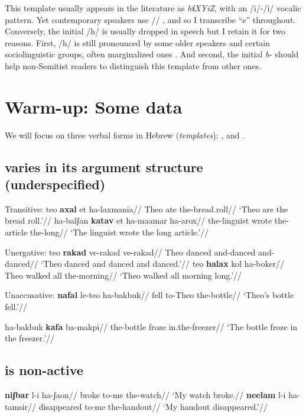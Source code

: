 This template usually appears in the literature as \emph{h\textbf{i}XYiZ}, with an /i/-/i/ vocalic pattern. Yet contemporary speakers use // \citep{trachtman16}, and so I transcribe ``e'' throughout. Conversely, the initial /h/ is usually dropped in speech but I retain it for two reasons. First, /h/ is still pronounced by some older speakers and certain sociolinguistic groups, often marginalized ones \citep[cf.~][]{schwarzwald81biu,gafter14phd}. And second, the initial \emph{h}- should help non-Semitist readers to distinguish this template from other ones.

\section{Warm-up: Some data}
We will focus on three verbal forms in Hebrew (\emph{templates}): {\tkal}, {\tnif} and {\thif}.

	\subsection{{\tkal} varies in its argument structure (underspecified)}
\pex Transitive:
	\a \begingl
		\gla teo \textbf{axal} et ha-laxmania//
		\glb Theo ate  the-bread.roll//
		\glft `Theo are the bread roll.'//
	\endgl
	\a \begingl
		\gla ha-balʃan \textbf{katav} et ha-maamar ha-arox//
		\glb the-linguist wrote  the-article the-long//
		\glft `The linguist wrote the long article.'//
	\endgl
\xe

\pex Unergative:
	\a \begingl
		\gla teo \textbf{rakad} ve-rakad ve-rakad//
		\glb Theo danced and-danced and-danced//
		\glft `Theo danced and danced and danced.'//
	\endgl
	\a \begingl
		\gla teo \textbf{halax} kol ha-boker//
		\glb Theo walked all the-morning//
		\glft `Theo walked all morning long.'//
	\endgl
\xe

\pex Unaccusative:
	\a \begingl
		\gla \textbf{nafal} le-teo ha-bakbuk//
		\glb fell to-Theo the-bottle//
		\glft `Theo's bottle fell.'//
	\endgl
	
	\a \begingl
		\gla ha-bakbuk \textbf{kafa} ba-makpi//
		\glb the-bottle froze in.the-freezer//
		\glft `The bottle froze in the freezer.'//
	\endgl
\xe


	\subsection{{\tnif} is non-active}
\pex
	\a \begingl
		\gla \textbf{niʃbar} l-i ha-ʃaon//
		\glb broke to-me the-watch//
		\glft `My watch broke.//
	\endgl
	\a \begingl
		\gla \textbf{neelam} l-i ha-tamsir//
		\glb disappeared to-me the-handout//
		\glft `My handout disappeared.'//
	\endgl
\xe

